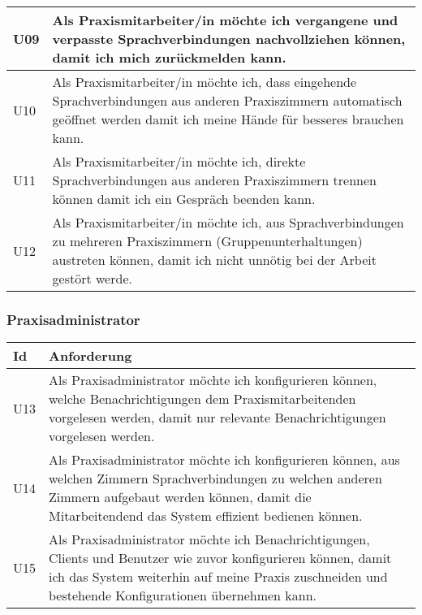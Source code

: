 \begin{table}[h]
\begin{tabular}{|l|p{15cm}|}
        \hline
        U09           & Als Praxismitarbeiter/in möchte ich vergangene und verpasste Sprachverbindungen nachvollziehen können, damit ich mich zurückmelden kann.                                                                  \\
        \hline
        U10           & Als Praxismitarbeiter/in möchte ich, dass eingehende Sprachverbindungen aus anderen Praxiszimmern automatisch geöffnet werden damit ich meine Hände für besseres brauchen kann.                           \\
        \hline
        U11           & Als Praxismitarbeiter/in möchte ich, direkte Sprachverbindungen aus anderen Praxiszimmern trennen können damit ich ein Gespräch beenden kann.                                                             \\
        \hline
        U12           & Als Praxismitarbeiter/in möchte ich, aus Sprachverbindungen zu mehreren Praxiszimmern (Gruppenunterhaltungen) austreten können, damit ich nicht unnötig bei der Arbeit gestört werde.                     \\
        \hline
    \end{tabular}\label{tab:userstories1}
\end{table}

\clearpage

\subsubsection*{Praxisadministrator}

\begin{table}[h]
    \centering
    \begin{tabular}{|l|p{15cm}|}
        \hline
        \textbf{Id} & \textbf{Anforderung}                                                                                                                                                                                                    \\
        \hline
        U13           & Als Praxisadministrator möchte ich konfigurieren können, welche Benachrichtigungen dem Praxismitarbeitenden vorgelesen werden, damit nur relevante Benachrichtigungen vorgelesen werden.                                \\
        \hline
        U14           & Als Praxisadministrator möchte ich konfigurieren können, aus welchen Zimmern Sprachverbindungen zu welchen anderen Zimmern aufgebaut werden können, damit die Mitarbeitendend das System effizient bedienen können.     \\
        \hline
        U15           & Als Praxisadministrator möchte ich Benachrichtigungen, Clients und Benutzer wie zuvor konfigurieren können, damit ich das System weiterhin auf meine Praxis zuschneiden und bestehende Konfigurationen übernehmen kann. \\
        \hline
    \end{tabular}\label{tab:userstories2}
\end{table}

